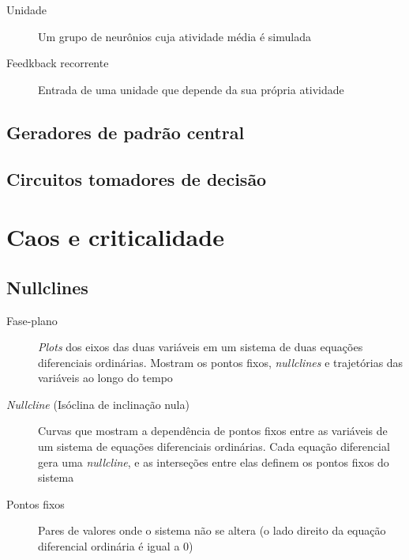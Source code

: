 \begin{description}
	\item[Unidade] Um grupo de neurônios cuja atividade média é simulada
	\item[Feedkback recorrente] Entrada de uma unidade que depende da sua própria atividade
\end{description}



\subsection{Geradores de padrão central}

\subsection{Circuitos tomadores de decisão}

\section{Caos e criticalidade}\label{sec:caos}

\subsection{Nullclines}
\begin{description}
	\item[Fase-plano] \textit{Plots} dos eixos das duas variáveis em um sistema de duas equações diferenciais ordinárias. Mostram os pontos fixos, \textit{nullclines} e trajetórias das variáveis ao longo do tempo
	\item[\textit{Nullcline} (Isóclina de inclinação nula)] Curvas que mostram a dependência de pontos fixos entre as variáveis de um sistema de equações diferenciais ordinárias. Cada equação diferencial gera uma \textit{nullcline}, e as interseções entre elas definem os pontos fixos do sistema
	\item[Pontos fixos] Pares de valores onde o sistema não se altera (o lado direito da equação diferencial ordinária é igual a 0)
\end{description}

